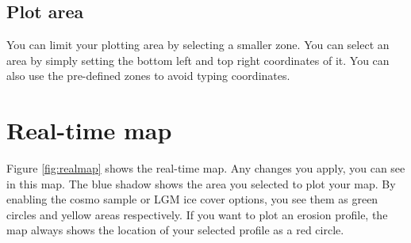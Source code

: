 \documentclass[11pt,a4paper,titlepage]{report}
\begin{document}
\subsection{Plot area}
You can limit your plotting area by selecting a smaller zone. You can select an area by simply setting the bottom left and top right coordinates of it. You can also use the pre-defined zones to avoid typing coordinates.

\section{Real-time map}
Figure \ref{fig:realmap} shows the real-time map. Any changes you apply, you can see in this map. The blue shadow shows the area you selected to plot your map. By enabling the cosmo sample or LGM ice cover options, you see them as green circles and yellow areas respectively. If you want to plot an erosion profile, the map always shows the location of your selected profile as a red circle.
\end{document}
